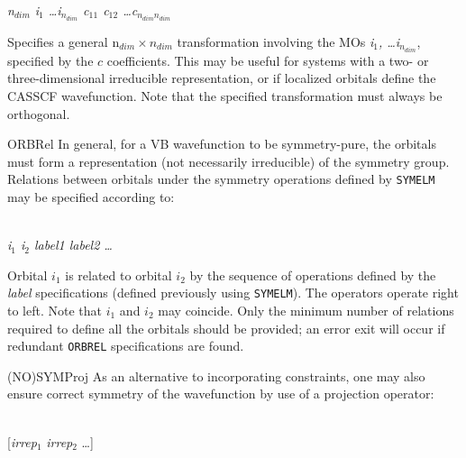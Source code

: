 \begin{keywordlist}
\\
{\em n$_{dim}$ i$_1$ \ldots i$_{n_{dim}}$ c$_{11}$ c$_{12}$
\ldots c$_{n_{dim}n_{dim}}$}

Specifies a general n$_{dim}\times n_{dim}$ transformation involving the MOs {\em i$_1$,
\ldots i$_{n_{dim}}$},
specified by the $c$ coefficients. This may be useful for systems with a two- or
three-dimensional irreducible representation, or if localized orbitals define the CASSCF
wavefunction. Note that the specified transformation must always be orthogonal.
\item[ORBRel]
In general, for a VB wavefunction to be symmetry-pure, the orbitals must form a representation
(not necessarily irreducible) of the symmetry group. Relations between orbitals under
the symmetry operations defined by {\tt SYMELM} may be specified according to:

\\
{\em i$_1$ i$_2$ label1 label2 \ldots}

Orbital $i_1$ is related to orbital $i_2$ by the sequence of operations defined by the {\em label\/}
specifications (defined previously using {\tt SYMELM}). The operators operate right to left. Note
that $i_1$ and $i_2$ may coincide. Only the minimum number of
relations required to define all the orbitals should be provided; an error exit
will occur if redundant {\tt ORBREL} specifications are found.
\item[(NO)SYMProj]
%
As an alternative to incorporating constraints, one may also ensure correct
symmetry of the wavefunction by use of a projection operator:

\\
{[}{\em irrep}$_1$ {\em irrep}$_2$ \ldots{]}


\end{keywordlist}
